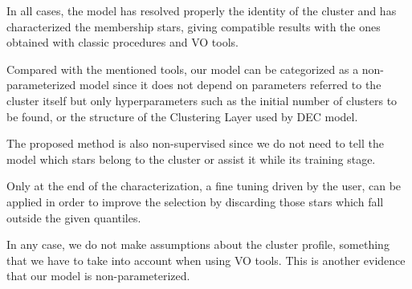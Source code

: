 \documentclass[11pt,a4paper,english,twocolumn]{article}
\begin{document}
\begin{table}[htbp]
  \begin{center}
    \caption{Right ascension, declination, radius and number of stars of studied clusters.
             The number of stars corresponds to those stars contained within a cone of center
             \((\alpha, \delta)\) and radius the cluster's radius multiplied by a factor of 1.5.}
    \label{tab:clusters_summary}
  \end{center}
\end{table}

In all cases, the model has resolved properly the identity of the cluster
and has characterized the membership stars, giving compatible results
with the ones obtained with classic procedures and VO tools.

Compared with the mentioned tools, our model can be categorized as a
non-parameterized model since it does not depend on parameters referred
to the cluster itself but only hyperparameters such as the initial number
of clusters to be found, or the structure of the Clustering Layer used by DEC model.

The proposed method is also non-supervised since we do not need to tell the model
which stars belong to the cluster or assist it while its training stage.

Only at the end of the characterization, a fine tuning driven by the user,
can be applied in order to improve the selection by discarding those
stars which fall outside the given quantiles.

In any case, we do not make assumptions about the cluster profile,
something that we have to take into account when using VO tools.
This is another evidence that our model is non-parameterized.
\end{document}
